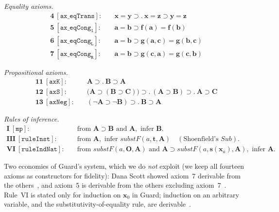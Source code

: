 \documentclass[11pt]{article}
\theoremstyle{plain}
\theoremstyle{definition}
\theoremstyle{remark}
\newcommand{\Sub}{\mathit{Sub}}
\newcommand{\substF}{\mathit{substF}}
\begin{document}
\noindent\emph{Equality axioms.}
\begin{align*}
\textbf{4}\ [\mathtt{ax\_eqTrans}]:\quad & \mathbf{x} = \mathbf{y} \supset .\ \mathbf{x} = \mathbf{z} \supset \mathbf{y} = \mathbf{z} \\
\textbf{5}\ [\mathtt{ax\_eqCong_1}]:\quad & \mathbf{a} = \mathbf{b} \supset \mathbf{f}(\mathbf{a}) = \mathbf{f}(\mathbf{b}) \\
\textbf{6}\ [\mathtt{ax\_eqCong_L}]:\quad & \mathbf{a} = \mathbf{b} \supset \mathbf{g}(\mathbf{a},\mathbf{c}) = \mathbf{g}(\mathbf{b},\mathbf{c}) \\
\textbf{7}\ [\mathtt{ax\_eqCong_R}]:\quad & \mathbf{a} = \mathbf{b} \supset \mathbf{g}(\mathbf{c},\mathbf{a}) = \mathbf{g}(\mathbf{c},\mathbf{b})
\end{align*}

\noindent\emph{Propositional axioms.}
\begin{align*}
\textbf{11}\ [\mathtt{axK}]:\quad & \mathbf{A} \supset .\ \mathbf{B} \supset \mathbf{A} \\
\textbf{12}\ [\mathtt{axS}]:\quad & \bigl(\mathbf{A} \supset (\mathbf{B} \supset \mathbf{C})\bigr) \supset .\ (\mathbf{A} \supset \mathbf{B}) \supset .\ \mathbf{A} \supset \mathbf{C} \\
\textbf{13}\ [\mathtt{axNeg}]:\quad & (\neg\mathbf{A} \supset \neg\mathbf{B}) \supset .\ \mathbf{B} \supset \mathbf{A}
\end{align*}

\noindent\emph{Rules of inference.}
\begin{align*}
\textbf{I}\ [\mathtt{mp}]:\quad & \text{from } \mathbf{A} \supset \mathbf{B} \text{ and } \mathbf{A}, \text{ infer } \mathbf{B}. \\
\textbf{III}\ [\mathtt{ruleInst}]:\quad & \text{from } \mathbf{A}, \text{ infer } \substF(a, \mathbf{t}, \mathbf{A}) \quad (\text{Shoenfield's } \Sub). \\
\textbf{VI}\ [\mathtt{ruleIndNat}]:\quad & \text{from } \substF(a, \mathbf{O}, \mathbf{A}) \text{ and } \mathbf{A} \supset \substF(a, \mathbf{s}(\mathbf{x}_a), \mathbf{A}), \text{ infer } \mathbf{A}.
\end{align*}

Two economies of Guard's system, which we do \emph{not} exploit (we keep
all fourteen axioms as constructors for fidelity): Dana Scott showed
axiom~7 derivable from the others~\cite[Exercise after Def.~6]{Guard1963},
and axiom~5 is derivable from the others excluding
axiom~7~\cite[Exercise~18]{Guard1963}.  Rule~VI is stated only for
induction on $\mathbf{x}_0$ in Guard; induction on an arbitrary variable,
and the substitutivity-of-equality rule, are derivable~\cite[Exercise~19]{Guard1963}.
\end{document}
